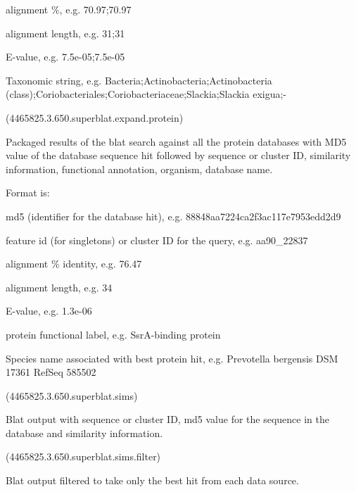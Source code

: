 \documentclass[letterpaper,10pt,english]{sphinxmanual}
\begin{document}
alignment \%, e.g. 70.97;70.97

alignment length, e.g. 31;31

E-value, e.g. 7.5e-05;7.5e-05

Taxonomic string, e.g. Bacteria;Actinobacteria;Actinobacteria
(class);Coriobacteriales;Coriobacteriaceae;Slackia;Slackia exigua;-

 (4465825.3.650.superblat.expand.protein)

Packaged results of the blat search against all the protein databases
with MD5 value of the database sequence hit followed by sequence or
cluster ID, similarity information, functional annotation, organism,
database name.

Format is:

md5 (identifier for the database hit), e.g.
88848aa7224ca2f3ac117e7953edd2d9

feature id (for singletons) or cluster ID for the query, e.g. aa90\_22837

alignment \% identity, e.g. 76.47

alignment length, e.g. 34

E-value, e.g. 1.3e-06

protein functional label, e.g. SsrA-binding protein

Species name associated with best protein hit, e.g. Prevotella bergensis
DSM 17361 RefSeq 585502

 (4465825.3.650.superblat.sims)

Blat output with sequence or cluster ID, md5 value for the sequence in
the database and similarity information.

 (4465825.3.650.superblat.sims.filter)

Blat output filtered to take only the best hit from each data source.
\end{document}
